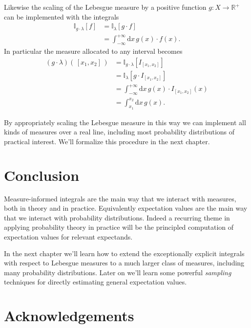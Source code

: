 \documentclass[
  letterpaper,
  DIV=11,
  numbers=noendperiod]{scrartcl}
\begin{document}
Likewise the scaling of the Lebesgue measure by a positive function
\(g : X \rightarrow \mathbb{R}^{+}\) can be implemented with the
integrals \begin{align*}
\mathbb{I}_{g \cdot \lambda}[f]
&=
\mathbb{I}_{\lambda}[g \cdot f]
\\
&=
\int_{-\infty}^{+\infty} \mathrm{d} x \, g(x) \cdot f(x).
\end{align*} In particular the measure allocated to any interval becomes
\begin{align*}
(g \cdot \lambda) ( \, [x_{1}, x_{2} ] \, )
&=
\mathbb{I}_{g \cdot \lambda}[ I_{ [x_{1}, x_{2}] } ]
\\
&=
\mathbb{I}_{\lambda}[ g \cdot I_{ [x_{1}, x_{2}] } ]
\\
&=
\int_{-\infty}^{+\infty}
\mathrm{d} x \, g(x) \cdot I_{ [x_{1}, x_{2}] }(x)
\\
&=
\int_{x_{1}}^{x_{2}} \mathrm{d} x \, g(x).
\end{align*}

By appropriately scaling the Lebesgue measure in this way we can
implement all kinds of measures over a real line, including most
probability distributions of practical interest. We'll formalize this
procedure in the next chapter.

\hypertarget{conclusion}{%
\section{Conclusion}\label{conclusion}}

Measure-informed integrals are the main way that we interact with
measures, both in theory and in practice. Equivalently expectation
values are the main way that we interact with probability distributions.
Indeed a recurring theme in applying probability theory in practice will
be the principled computation of expectation values for relevant
expectands.

In the next chapter we'll learn how to extend the exceptionally explicit
integrals with respect to Lebesgue measures to a much larger class of
measures, including many probability distributions. Later on we'll learn
some powerful \emph{sampling} techniques for directly estimating general
expectation values.

\hypertarget{acknowledgements}{%
\section*{Acknowledgements}\label{acknowledgements}}
\end{document}
